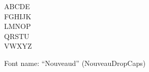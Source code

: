 \documentclass[a4paper]{article}
\begin{document}
\begin{center}
\fontsize{60pt}{72pt}
  ABCDE \\
  FGHIJK \\
  LMNOP \\
  QRSTU \\
  VWXYZ \\
\end{center}
\vfill
\begin{center}
Font name: ``Nouveaud'' (NouveauDropCaps)
\end{center}
\end{document}
